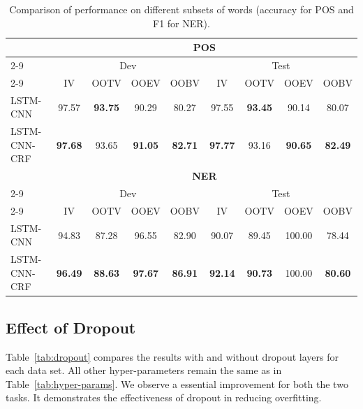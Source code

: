 \documentclass[11pt]{article}
\begin{document}
\begin{table}
\centering
\begin{tabular}[t]{l|cccc|cccc}
\hline
 & \multicolumn{8}{c}{\textbf{POS}} \\
 \cline{2-9}
 & \multicolumn{4}{c|}{Dev} & \multicolumn{4}{c}{Test} \\
 \cline{2-9}
 & IV & OOTV & OOEV & OOBV & IV & OOTV & OOEV & OOBV \\
\hline
LSTM-CNN & 97.57 & \textbf{93.75} & 90.29 & 80.27 & 97.55 & \textbf{93.45} & 90.14 & 80.07 \\
LSTM-CNN-CRF & \textbf{97.68} & 93.65 & \textbf{91.05} & \textbf{82.71} & \textbf{97.77} & 93.16 & \textbf{90.65} & \textbf{82.49} \\
\hline
& \multicolumn{8}{c}{\textbf{NER}} \\
 \cline{2-9}
 & \multicolumn{4}{c|}{Dev} & \multicolumn{4}{c}{Test} \\
 \cline{2-9}
 & IV & OOTV & OOEV & OOBV & IV & OOTV & OOEV & OOBV \\
\hline
LSTM-CNN & 94.83 & 87.28 & 96.55 & 82.90 & 90.07 & 89.45 & 100.00 & 78.44 \\
LSTM-CNN-CRF & \textbf{96.49} & \textbf{88.63} & \textbf{97.67} & \textbf{86.91} & \textbf{92.14} & \textbf{90.73} & 100.00 & \textbf{80.60} \\
\hline
\end{tabular}
\caption{Comparison of performance on different subsets of words (accuracy for POS and F1 for NER).}
\label{tab:oov}
\end{table}

\subsection{Effect of Dropout}
\label{subsec:dropout}
Table~\ref{tab:dropout} compares the results with and without dropout layers for each data set.
All other hyper-parameters remain the same as in Table~\ref{tab:hyper-params}. We observe a essential improvement for both the two tasks. It demonstrates the effectiveness of dropout in reducing overfitting.
\end{document}

